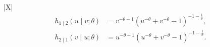 \documentclass[12pt,oneside,a4paper]{book}
\theoremstyle{definition}
\theoremstyle{remark}
\begin{document}
\begin{table}[H]
\begin{tabularx}{\textwidth}{|X|}
			\[
			\begin{aligned}
				h_{1\mid2}(u\mid v;\theta)
				&=
				v^{-\theta-1}
				\left(
				u^{-\theta}+v^{-\theta}-1
				\right)^{-1-\frac{1}{\theta}},
				\\[4pt]
				h_{2\mid1}(v\mid u;\theta)
				&=
				u^{-\theta-1}
				\left(
				u^{-\theta}+v^{-\theta}-1
				\right)^{-1-\frac{1}{\theta}}.
			\end{aligned}
			\]


			\\
			\hline

		\end{tabularx}
		\caption{Bivariate copula families, corresponding copula densities,
			$h$-functions, and inverse $h$-functions.}
		\label{tab:copula_definitions}
	\end{table}
	
	
\end{document}

